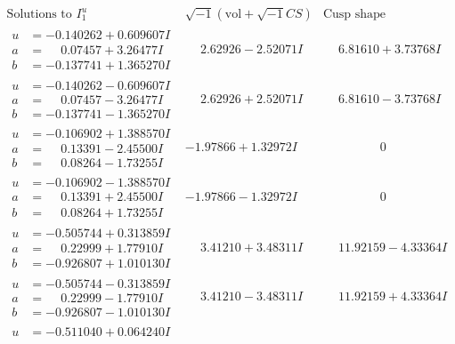 \documentclass[1p]{elsarticle_modified}
\theoremstyle{definition}
\newcommand{\I}{\sqrt{-1}}
\begin{document}
$$\begin{array}{c|c|c}
\text{Solutions to }I^u_{1}& \I (\text{vol} + \sqrt{-1}CS) & \text{Cusp shape}\\
 \hline 
\begin{aligned}
u &= -0.140262 + 0.609607 I \\
a &= \phantom{-}0.07457 + 3.26477 I \\
b &= -0.137741 + 1.365270 I\end{aligned}
 & \phantom{-}2.62926 - 2.52071 I & \phantom{-}6.81610 + 3.73768 I \\ \hline\begin{aligned}
u &= -0.140262 - 0.609607 I \\
a &= \phantom{-}0.07457 - 3.26477 I \\
b &= -0.137741 - 1.365270 I\end{aligned}
 & \phantom{-}2.62926 + 2.52071 I & \phantom{-}6.81610 - 3.73768 I \\ \hline\begin{aligned}
u &= -0.106902 + 1.388570 I \\
a &= \phantom{-}0.13391 - 2.45500 I \\
b &= \phantom{-}0.08264 - 1.73255 I\end{aligned}
 & -1.97866 + 1.32972 I & \phantom{-0.000000 } 0 \\ \hline\begin{aligned}
u &= -0.106902 - 1.388570 I \\
a &= \phantom{-}0.13391 + 2.45500 I \\
b &= \phantom{-}0.08264 + 1.73255 I\end{aligned}
 & -1.97866 - 1.32972 I & \phantom{-0.000000 } 0 \\ \hline\begin{aligned}
u &= -0.505744 + 0.313859 I \\
a &= \phantom{-}0.22999 + 1.77910 I \\
b &= -0.926807 + 1.010130 I\end{aligned}
 & \phantom{-}3.41210 + 3.48311 I & \phantom{-}11.92159 - 4.33364 I \\ \hline\begin{aligned}
u &= -0.505744 - 0.313859 I \\
a &= \phantom{-}0.22999 - 1.77910 I \\
b &= -0.926807 - 1.010130 I\end{aligned}
 & \phantom{-}3.41210 - 3.48311 I & \phantom{-}11.92159 + 4.33364 I \\ \hline\begin{aligned}
u &= -0.511040 + 0.064240 I \\

\end{aligned}
\end{array}$$
\end{document}
